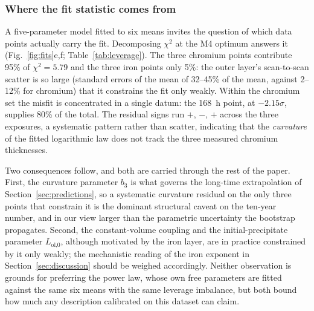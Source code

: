 \documentclass[pdflatex,sn-nature]{sn-jnl}
\begin{document}
\subsubsection*{Where the fit statistic comes from}

A five-parameter model fitted to six means invites the question of which
data points actually carry the fit. Decomposing $\chi^2$ at the M4
optimum answers it (Fig.~\ref{fig:fits}e,f;
Table~\ref{tab:leverage}). The three chromium points contribute 95\% of
$\chi^2 = 5.79$ and the three iron points only 5\%: the outer layer's
scan-to-scan scatter is so large (standard errors of the mean of 32--45\%
of the mean, against 2--12\% for chromium) that it constrains the fit
only weakly. Within the chromium set the misfit is concentrated in a
single datum: the 168~h point, at $-2.15\sigma$, supplies 80\% of the
total. The residual signs run $+$, $-$, $+$ across the three
exposures, a systematic pattern rather than scatter, indicating that the
\emph{curvature} of the fitted logarithmic law does not track the three
measured chromium thicknesses.

Two consequences follow, and both are carried through the rest of the
paper. First, the curvature parameter $b_3$ is what governs the long-time
extrapolation of Section~\ref{sec:predictions}, so a systematic curvature
residual on the only three points that constrain it is the dominant
structural caveat on the ten-year number, and in our view larger than the
parametric uncertainty the bootstrap propagates. Second, the
constant-volume coupling and the initial-precipitate parameter
$L_\text{ol,0}$, although motivated by the iron layer, are in practice
constrained by it only weakly; the mechanistic reading of the iron
exponent in Section~\ref{sec:discussion} should be weighed accordingly.
Neither observation is grounds for preferring the power law, whose own
free parameters are fitted against the same six means with the same
leverage imbalance, but both bound how much any description calibrated on
this dataset can claim.
\end{document}
